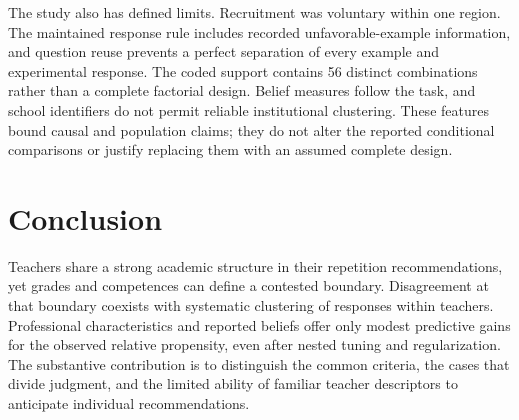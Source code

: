 
The study also has defined limits. Recruitment was voluntary within one region. The maintained response rule includes recorded unfavorable-example information, and question reuse prevents a perfect separation of every example and experimental response. The coded support contains 56 distinct combinations rather than a complete factorial design. Belief measures follow the task, and school identifiers do not permit reliable institutional clustering. These features bound causal and population claims; they do not alter the reported conditional comparisons or justify replacing them with an assumed complete design.

\section{Conclusion}
Teachers share a strong academic structure in their repetition recommendations, yet grades and competences can define a contested boundary. Disagreement at that boundary coexists with systematic clustering of responses within teachers. Professional characteristics and reported beliefs offer only modest predictive gains for the observed relative propensity, even after nested tuning and regularization. The substantive contribution is to distinguish the common criteria, the cases that divide judgment, and the limited ability of familiar teacher descriptors to anticipate individual recommendations.

\clearpage
\begingroup\color{revised}\endgroup
\clearpage\appendix\let\originalsection\section\renewcommand{\section}{\sectionfloatbarrier\originalsection}
